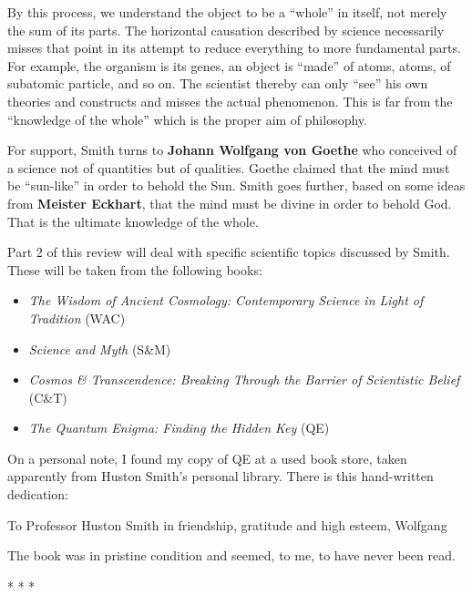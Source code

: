 By this process, we understand the object to be a ``whole'' in itself, not merely the sum of its parts. The horizontal causation described by science necessarily misses that point in its attempt to reduce everything to more fundamental parts. For example, the organism is its genes, an object is ``made'' of atoms, atoms, of subatomic particle, and so on. The scientist thereby can only ``see'' his own theories and constructs and misses the actual phenomenon. This is far from the ``knowledge of the whole'' which is the proper aim of philosophy.

For support, Smith turns to \textbf{Johann Wolfgang von Goethe} who conceived of a science not of quantities but of qualities. Goethe claimed that the mind must be ``sun-like'' in order to behold the Sun. Smith goes further, based on some ideas from \textbf{Meister Eckhart}, that the mind must be divine in order to behold God. That is the ultimate knowledge of the whole.

Part 2 of this review will deal with specific scientific topics discussed by Smith. These will be taken from the following books:

\begin{itemize}
\item \textit{The Wisdom of Ancient Cosmology: Contemporary Science in Light of Tradition} (WAC) \item \textit{Science and Myth} (S\&M) \item \textit{Cosmos \& Transcendence: Breaking Through the Barrier of Scientistic Belief} (C\&T) \item \textit{The Quantum Enigma: Finding the Hidden Key} (QE) 
\end{itemize}

On a personal note, I found my copy of QE at a used book store, taken apparently from Huston Smith's personal library. There is this hand-written dedication:

\begin{quotex}
To Professor Huston Smith in friendship, gratitude and high esteem, Wolfgang
\end{quotex}


The book was in pristine condition and seemed, to me, to have never been read.



\begin{center}* * *\end{center}

